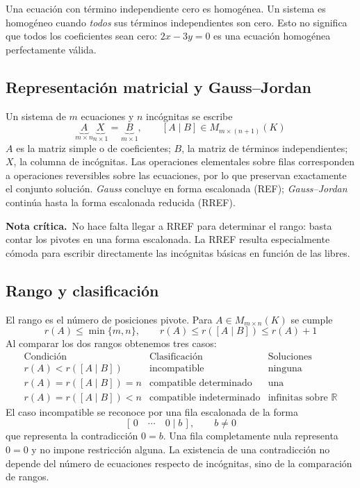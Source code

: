 \documentclass[11pt,a4paper]{article}
\newcommand{\anote}[1]{\par{\color{rednote}\textbf{Nota crítica.}\ #1}\par}
\begin{document}
Una ecuación con término independiente cero es homogénea. Un sistema es homogéneo cuando \emph{todos} sus términos independientes son cero. Esto no significa que todos los coeficientes sean cero: $2x-3y=0$ es una ecuación homogénea perfectamente válida.

\subsection{Representación matricial y Gauss--Jordan}
Un sistema de $m$ ecuaciones y $n$ incógnitas se escribe
\[
\underbrace{A}_{m\times n}\underbrace{X}_{n\times1}
=\underbrace{B}_{m\times1},\qquad [A\mid B]\in M_{m\times(n+1)}(K)
\]
$A$ es la matriz simple o de coeficientes; $B$, la matriz de términos independientes; $X$, la columna de incógnitas. Las operaciones elementales sobre filas corresponden a operaciones reversibles sobre las ecuaciones, por lo que preservan exactamente el conjunto solución. \emph{Gauss} concluye en forma escalonada (REF); \emph{Gauss--Jordan} continúa hasta la forma escalonada reducida (RREF).

\anote{No hace falta llegar a RREF para determinar el rango: basta contar los pivotes en una forma escalonada. La RREF resulta especialmente cómoda para escribir directamente las incógnitas básicas en función de las libres.}

\subsection{Rango y clasificación}
El rango es el número de posiciones pivote. Para $A\in M_{m\times n}(K)$ se cumple
\[
r(A)\le\min\{m,n\},\qquad
r(A)\le r([A\mid B])\le r(A)+1
\]
Al comparar los dos rangos obtenemos tres casos:
\[
\begin{array}{c|c|c}
\text{Condición}&\text{Clasificación}&\text{Soluciones}\\\hline
r(A)<r([A\mid B])&\text{incompatible}&\text{ninguna}\\
r(A)=r([A\mid B])=n&\text{compatible determinado}&\text{una}\\
r(A)=r([A\mid B])<n&\text{compatible indeterminado}&\text{infinitas sobre }\mathbb R
\end{array}
\]
El caso incompatible se reconoce por una fila escalonada de la forma
\[
[\,0\quad\cdots\quad0\mid b\,],\qquad b\ne0
\]
que representa la contradicción $0=b$. Una fila completamente nula representa $0=0$ y no impone restricción alguna. La existencia de una contradicción no depende del número de ecuaciones respecto de incógnitas, sino de la comparación de rangos.
\end{document}
